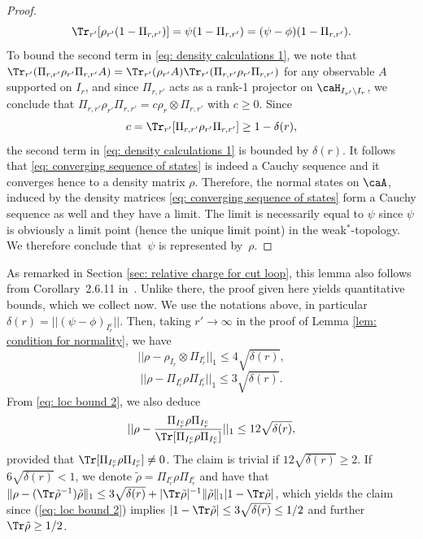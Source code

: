 \begin{proof}
	\begin{equation*}
		\Tr_{r'} [\rho_{r'} (1-\Pi_{r,r'})] = \psi(1-\Pi_{r,r'}) = (\psi - \phi)(1-\Pi_{r,r'}).
	\end{equation*}
	To bound the second term in \eqref{eq: density calculations 1}, we note that $\Tr_{r'}(\Pi_{r,r'} \rho_{r'}\Pi_{r,r'}A) = \Tr_{r'}(\rho_{r'}A) \Tr_{r'}(\Pi_{r,r'} \rho_{r'}\Pi_{r,r'})$ for any observable $A$ supported on $I_r$, and since $\Pi_{r,r'}$ acts as a rank-1 projector on $\caH_{I_{r'}\setminus I_r}$, we conclude that 
	$\Pi_{r,r'} \rho_{r'}\Pi_{r,r'}=c\rho_r\otimes \Pi_{r,r'}$ with $c\geq 0$.  Since 
	$$
	c=\Tr_{r'} [\Pi_{r,r'} \rho_{r'}\Pi_{r,r'}]\geq 1-\delta(r),
	$$ 
	the second term in \eqref{eq: density calculations 1} is bounded by $\delta(r)$.  It follows that \eqref{eq: converging sequence of states} is indeed a Cauchy sequence and it converges hence to a density matrix $\rho$. Therefore, the normal states on $\caA$, induced by the density matrices \eqref{eq: converging sequence of states} form a Cauchy sequence as well and they have a limit. The limit is necessarily equal to $\psi$ since $\psi$ is obviously a limit point (hence the unique limit point)  in the weak$^*$-topology. We therefore conclude that~$\psi$ is represented by~$\rho$.  
\end{proof}

As remarked in Section \ref{sec: relative charge for cut loop},  this lemma also follows from Corollary~2.6.11 in~\cite{BratRob}.  Unlike there, the proof given here yields quantitative bounds, which we collect now. We use the notations above, in particular $\delta(r)=||(\psi-\phi)_{{I_{r}^c}}||$. Then, taking $r'\to\infty$ in the proof of Lemma \ref{lem: condition for normality}, we have
\begin{equation} \label{eq: loc bound 1}
	||\rho-\rho_{I_r} \otimes \Pi_{I_{r}^c}||_1 \leq  4\sqrt{\delta(r)},
\end{equation}
\begin{equation}\label{eq: loc bound 2}
	||\rho- \Pi_{I_{r}^c}\rho \Pi_{I_{r}^c} ||_1 \leq  3\sqrt{\delta(r)}.
\end{equation}
From \eqref{eq: loc bound 2}, we also deduce 
\begin{equation} \label{eq: loc bound 3}
	||\rho- \frac{\Pi_{I_{r}^c}\rho \Pi_{I_{r}^c}}{\Tr[\Pi_{I_{r}^c}\rho \Pi_{I_{r}^c}]}||_1\leq    12 \sqrt{\delta(r)},  
\end{equation}
provided that $\Tr[\Pi_{I_{r}^c}\rho \Pi_{I_{r}^c}]\neq 0$. The claim is trivial if $12 \sqrt{\delta(r)}\geq 2$. If $6 \sqrt{\delta(r)}< 1$, we denote $\tilde\rho = \Pi_{I_{r}^c}\rho \Pi_{I_{r}^c}$ and have that $\Vert\rho - (\Tr\tilde\rho^{-1})\tilde\rho\Vert_1\leq 3\sqrt{\delta(r)} + \vert\Tr\tilde\rho\vert^{-1}\Vert \tilde\rho\Vert_1\vert 1-\Tr\tilde\rho\vert$, which yields the claim since (\ref{eq: loc bound 2}) implies $\vert 1- \Tr\tilde\rho\vert\leq 3\sqrt{\delta(r)} \leq 1/2$ and further $\Tr\tilde\rho\geq 1/2$. 



